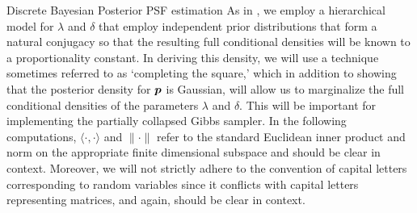 \begin{chapter}{Discrete Bayesian Posterior PSF estimation}
As in \citep{bardsley2012mcmc}, we employ a hierarchical model for $\lambda$ and $\delta$ that employ independent prior distributions that form a natural conjugacy so that the resulting full conditional densities will be known to a proportionality constant.
In deriving this density, we will use a technique sometimes referred to as `completing the square,' which in addition to showing that the posterior density for $\mbox{\boldmath$p$}$ is Gaussian, will allow us to marginalize the full conditional densities of the parameters $\lambda$ and $\delta$.
This will be important for implementing the partially collapsed Gibbs sampler.
In the following computations, $\langle \cdot, \cdot \rangle$ and $\|\cdot\|$ refer to the standard Euclidean inner product and norm on the appropriate finite dimensional subspace and should be clear in context.
Moreover, we will not strictly adhere to the convention of capital letters corresponding to random variables since it conflicts with capital letters representing matrices, and again, should be clear in context.


\end{chapter}
